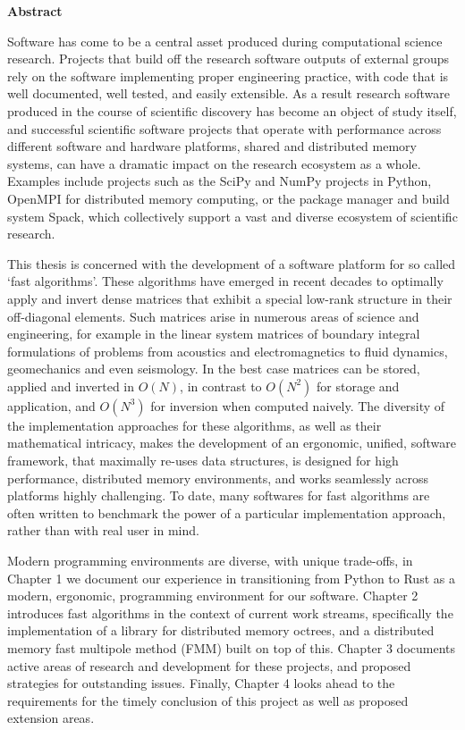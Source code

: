 \thispagestyle{plain}

\begin{center}
    \textbf{Abstract}
\end{center}

Software has come to be a central asset produced during
computational science research. Projects that build off the research software outputs of external
groups rely on the software implementing proper engineering practice,
with code that is well documented, well tested, and easily extensible. As a
result research software produced in the course of scientific discovery has
become an object of study itself, and successful scientific software projects
that operate with performance across different software and hardware platforms,
shared and distributed memory systems, can have a dramatic impact on the
research ecosystem as a whole. Examples include projects such as the SciPy and
NumPy projects in Python, OpenMPI for distributed memory computing, or the package
manager and build system Spack, which collectively support a vast and diverse ecosystem of scientific
research.

This thesis is concerned with the development of a software platform
for so called `fast algorithms'. These algorithms have emerged in recent decades to
optimally apply and invert dense matrices that exhibit
a special low-rank structure in their off-diagonal elements. Such matrices arise
in numerous areas of science and engineering, for example in the linear system
matrices of boundary integral formulations of problems from acoustics and
electromagnetics to fluid dynamics, geomechanics and even seismology. In the
best case matrices can be stored, applied and inverted in $O(N)$, in contrast
to $O(N^2)$ for storage and application, and $O(N^3)$ for inversion when computed
naively. The diversity of the implementation approaches for these algorithms, as
well as their mathematical intricacy, makes the development of an ergonomic,
unified, software framework, that maximally re-uses data structures, is designed
for high performance, distributed memory environments, and works seamlessly
across platforms highly challenging. To date, many softwares for fast algorithms
are often written to benchmark the power of a particular implementation approach,
rather than with real user in mind.

 Modern programming environments are diverse, with unique trade-offs, in Chapter 1 we document our experience in transitioning from Python to Rust as a
modern, ergonomic, programming environment for our software. Chapter 2 introduces
fast algorithms in the context of current work streams, specifically the
implementation of a library for distributed memory octrees, and a distributed memory fast
multipole method (FMM) built on top of this. Chapter 3 documents active areas
of research and development for these projects, and proposed strategies for
outstanding issues. Finally, Chapter 4 looks ahead to the requirements for the
timely conclusion of this project as well as proposed extension areas.
